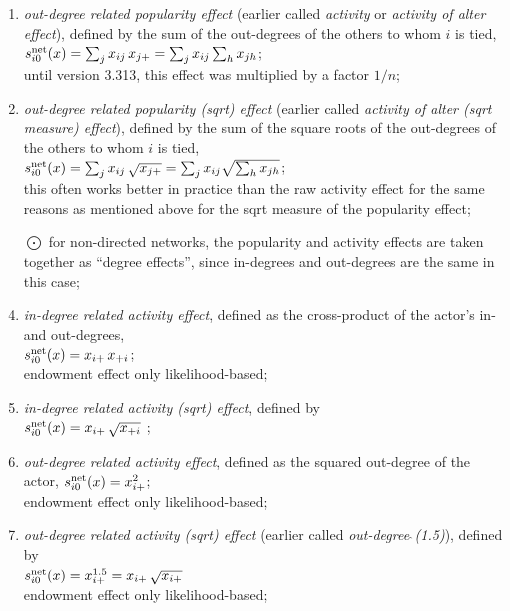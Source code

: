 \documentclass[a4paper,fleqn]{article}
\newcommand{\+}{\, + \,}
\newcommand{\vit}{\theenumi}
\begin{document}
{\begin{enumerate}
 \item {\em out-degree related popularity effect}
 (earlier called {\em activity} or {\em activity of alter effect}), defined by
  the sum of the out-degrees
 of the others to whom $i$ is tied,\\
 $s^{\rm net}_{i\vit}(x) =  \sum_j x_{ij}\, x_{j+} =
  \sum_j x_{ij} \sum_h x_{jh} $; \\
 until version 3.313, this effect was multiplied by a factor $1/n$;


 \item {\em out-degree related popularity (sqrt) effect}
 (earlier called {\em activity of alter (sqrt measure) effect}), defined by the sum of
 the square roots of the out-degrees of the others to whom $i$ is tied,\\
 $s^{\rm net}_{i\vit}(x) = \sum_j x_{ij}\, \sqrt{x_{j+}} =
  \sum_j x_{ij} \sqrt{\sum_h x_{jh}} $;\\
 this often works better in practice than the raw activity effect
 for the same reasons as mentioned above for the sqrt measure of the popularity effect;

 \item[{\hspace*{-1ex}$\bigodot$}] for non-directed networks, the popularity and activity
 effects are taken together as ``degree effects'',
 since in-degrees and out-degrees are the same in this case;

 \item {\em in-degree related activity effect}, defined as
   the cross-product  of the actor's in- and out-degrees,\\
 $s^{\rm net}_{i\vit}(x) = x_{i+}\, x_{+i}$;\\
 endowment effect only likelihood-based;

 \item {\em in-degree related activity (sqrt) effect}, defined by  \\
 $s^{\rm net}_{i\vit}(x) = x_{i+}\,\sqrt{x_{+i}}$ ;

 \item {\em out-degree related activity effect}, defined as
   the squared out-degree of the actor,
 $s^{\rm net}_{i\vit}(x) = x^2_{i+}$;\\
 endowment effect only likelihood-based;

 \item {\em out-degree related activity (sqrt) effect}
 (earlier called {\em out-degree$\,\hat{\ }$(1.5)}), defined by  \\
 $s^{\rm net}_{i\vit}(x) = x^{1.5}_{i+} = x_{i+}\,\sqrt{x_{i+}}$ \\
 endowment effect only likelihood-based;


\end{enumerate}}
\end{document}

